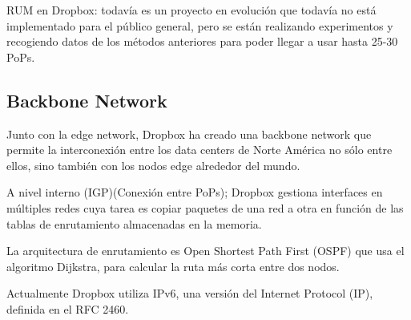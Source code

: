 RUM en Dropbox: todavía es un proyecto en evolución que todavía no está implementado para el público general, pero se están realizando experimentos y recogiendo datos de los métodos anteriores para poder llegar a usar hasta 25-30 PoPs.

\subsection{Backbone Network}
Junto con la edge network, Dropbox ha creado una backbone network que permite la interconexión entre los data centers de Norte América no sólo entre ellos, sino también con los nodos edge alrededor del mundo.

A nivel interno (IGP)(Conexión entre PoPs); 
Dropbox gestiona interfaces en múltiples redes cuya tarea es copiar paquetes de una red a otra en función de las tablas de enrutamiento almacenadas en la memoria.

La arquitectura de enrutamiento es  Open Shortest Path First (OSPF) que usa el algoritmo Dijkstra, para calcular la ruta más corta entre dos nodos.

Actualmente Dropbox utiliza IPv6, una versión del Internet Protocol (IP), definida en el RFC 2460.

